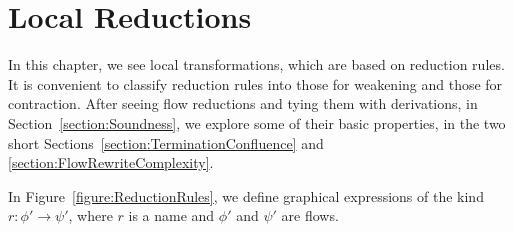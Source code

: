 \chapter{Local Reductions}

In this chapter, we see local transformations, which are based on reduction rules. It is convenient to classify reduction rules into those for weakening and those for contraction. After seeing flow reductions and tying them with derivations, in Section~\vref{section:Soundness}, we explore some of their basic properties, in the two short Sections~\vref{section:TerminationConfluence} and \vref{section:FlowRewriteComplexity}.

\begin{definition}\label{definition:FlowGraphicalExpressions}
In Figure~\vref{figure:ReductionRules}, we define graphical expressions of the kind $r\colon\phi'\to\psi'$, where $r$ is a name and $\phi'$ and $\psi'$ are flows.
\end{definition}

